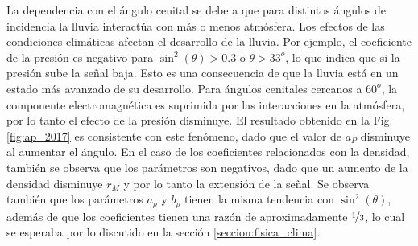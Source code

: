         La dependencia con el ángulo cenital se debe a que para distintos ángulos de incidencia la lluvia interactúa con más o menos atmósfera. Los efectos de las condiciones climáticas afectan el desarrollo de la lluvia. Por ejemplo, el coeficiente de la presión  es negativo para $\sin^2(\theta)>0.3$ o $\theta>33^o$, lo que indica que si la presión sube la señal baja. Esto es una consecuencia de que la lluvia  está en un estado más avanzado de su desarrollo. Para ángulos cenitales cercanos a $60^o$, la componente electromagnética es suprimida por las interacciones en la atmósfera, por lo tanto el efecto de la presión disminuye. El resultado obtenido en la Fig.\,\ref{fig:ap_2017} es consistente con este fenómeno, dado que el valor de $a_P$ disminuye al aumentar el ángulo. 		En el caso de los coeficientes relacionados con la densidad, también se observa que los parámetros son negativos, dado que un aumento de la densidad disminuye $r_M$ y por lo tanto la extensión de la señal. Se observa también que los parámetros $a_\rho$ y $b_\rho$ tienen la misma tendencia con $\sin^2(\theta)$, además de que los coeficientes tienen una razón de aproximadamente $\nicefrac{1}{3}$, lo cual se esperaba por lo discutido en la sección \ref{seccion:fisica_clima}.
